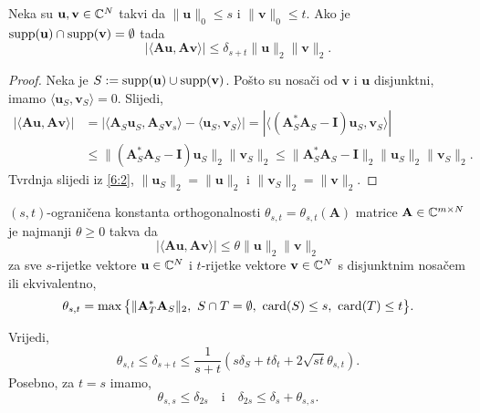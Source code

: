 \documentclass[a4paper,twoside,12pt]{memoir} %
\newcommand{\vect}[1]{\mathbf{#1}}
\renewcommand{\vec}{\vect}
\newcommand{\card}{\text{\normalfont{card}}}
\newcommand{\supp}{\text{\normalfont{supp}}}
\newcommand{\norm}[1]{\|{#1}\|}
\begin{document}
\begin{prop}\label{prop:6:3}
    Neka su $\vec u, \vec v \in \C^N$ takvi da $\norm{\vec u}_0 \leq s$ i $\norm{\vec v}_0 \leq t$. Ako je $\supp(\vec u ) \cap \supp(\vec v) = \emptyset$ tada
    \begin{equation}\label{6:3}
        |\langle \vec{Au}, \vec{Av} \rangle| \leq \delta_{s+t} \norm{\vec u}_2 \norm{\vec v}_2.
    \end{equation}
\end{prop}
\begin{proof}
    Neka je $S:=\supp(\vec u) \cup \supp(\vec v)$. Po\v{s}to su nosa\v{c}i od $\vec v$ i $\vec u $ disjunktni, imamo $\langle \vec u_S, \vec v_S \rangle = 0$. Slijedi,
    \begin{align*}
        |\langle \vec{Au}, \vec{Av} \rangle| &= |\langle \vec A_S \vec u_S, \vec A_S \vec v_s  \rangle - \langle \vec u_S, \vec v_S \rangle| = |\langle (\vec A^*_S \vec A_S - \vec I)\vec u_S, \vec v_S \rangle| \\[1em]
        &\leq \norm{(\vec A^*_S \vec A_S - \vec I) \vec u_S}_2 \norm{\vec v_S}_2 \leq \norm{\vec A^*_S \vec A_S - \vec I}_2 \norm{\vec u_S}_2 \norm{\vec v_S}_2.
    \end{align*}
    Tvrdnja slijedi iz \eqref{6:2}, $\norm{\vec u_S}_2 = \norm{\vec u}_2$ i $\norm{\vec v_S}_2 = \norm{\vec v}_2$.
\end{proof}
\begin{defn}
    $(s,t)$-ograni\v{c}ena konstanta orthogonalnosti $\theta_{s,t} = \theta_{s,t}(\vec A)$ matrice $\vec A \in \C^{m \times N}$ je najmanji $\theta \geq 0$ takva da
    \begin{equation}\label{6:4}
        |\langle \vec{Au}, \vec{Av} \rangle| \leq \theta \norm{\vec u}_2 \norm{\vec v}_2
    \end{equation}
    za sve $s$-rijetke vektore $\vec u \in \C^N$ i $t$-rijetke vektore $\vec v \in \C^N$ s disjunktnim nosa\v{c}em ili ekvivalentno, 
    \begin{equation}\label{6:5}
        \theta_{s, t} = \max \big\{ \norm{\vec A^*_T \vec A_S}_2,\ S \cap T = \emptyset,\ \card(S) \leq s,\ \card(T) \leq t \big\} .
    \end{equation}
\end{defn}
\begin{prop}\label{prop:6:5}
    Vrijedi, 
    \begin{equation*}
        \theta_{s,t} \leq \delta_{s+t} \leq \frac{1}{s+t} (s \delta_S + t\delta_t + 2 \sqrt{st} \theta_{s,t}).
    \end{equation*}
    Posebno, za $t = s$ imamo,
    \begin{equation*}
        \theta_{s,s} \leq \delta_{2s} \quad \text{i} \quad \delta_{2s} \leq \delta_s + \theta_{s,s}.
    \end{equation*}
\end{prop}
\end{document}
